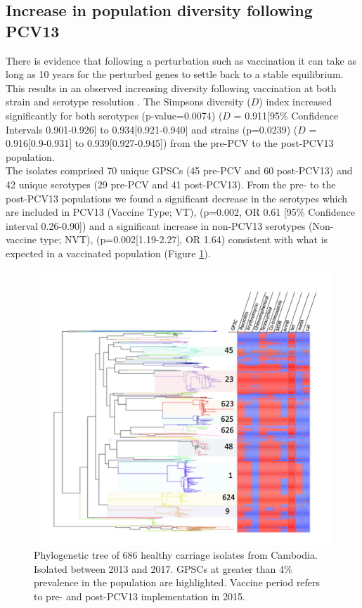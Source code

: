 \documentclass{article}
\begin{document}
\subsection{Increase in population diversity following PCV13}
There is evidence that following a perturbation such as vaccination it can take as long as 10 years for the perturbed genes to settle back to a stable equilibrium. This results in an observed increasing diversity following vaccination at both strain and serotype resolution \cite{hanageEvidenceThatPneumococcal2010,lepolaindewarouxPredictingImpactPneumococcal2018}. The Simpsons diversity ($D$) index increased significantly for both serotypes (p-value=0.0074) ($D$ = 0.911[95\% Confidence Intervals 0.901-0.926] to 0.934[0.921-0.940] and strains (p=0.0239) ($D$ = 0.916[0.9-0.931] to 0.939[0.927-0.945]) from the pre-PCV to the post-PCV13 population. 
\\The isolates comprised 70 unique GPSCs (45 pre-PCV and 60 post-PCV13) and 42 unique serotypes (29 pre-PCV and 41 post-PCV13). From the pre- to the post-PCV13 populations we found a significant decrease in the serotypes which are included in PCV13 (Vaccine Type; VT), (p=0.002, OR 0.61 [95\% Confidence interval 0.26-0.90]) and a significant increase in non-PCV13 serotypes (Non-vaccine type; NVT), (p=0.002[1.19-2.27], OR 1.64) consistent with what is expected in a vaccinated population \cite{rodrigoImpactInfant13valent2015,turnerImpact13ValentPneumococcal2020,loPneumococcalLineagesAssociated2019,lepolaindewarouxPredictingImpactPneumococcal2018} (Figure \ref{fig:tree}).
\begin{figure}
    \centering
    \includegraphics[width=\textwidth]{tree.png}
    \caption{Phylogenetic tree of 686 healthy carriage isolates from Cambodia. Isolated between 2013 and 2017. GPSCs at greater than 4\% prevalence in the population are highlighted. Vaccine period refers to pre- and post-PCV13 implementation in 2015.}
    \label{fig:tree}
\end{figure}
\end{document}
